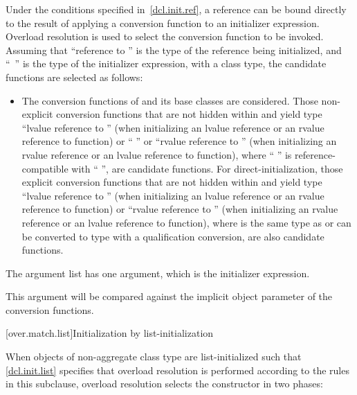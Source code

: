 \pnum
Under the conditions specified in~\ref{dcl.init.ref}, a reference can be bound directly
to the result of applying a conversion
function to an initializer expression.
Overload resolution is used to select the
conversion function to be invoked.
Assuming that ``reference to  '' is the
type of the reference being initialized, and
``\cv{}~'' is the type
of the initializer expression, with
a class type,
the candidate functions are selected as follows:
\begin{itemize}
\item
The conversion functions of
and its base classes are considered.
Those non-explicit conversion functions that are not hidden within
and yield type ``lvalue reference to  ''
(when initializing an lvalue reference or an rvalue reference to function) or
`` ''
or ``rvalue reference to  '' (when initializing an
rvalue reference or an lvalue reference to function),
where `` '' is reference-compatible
with `` '',
are candidate functions. For direct-initialization, those explicit
conversion functions that are not hidden within  and yield
type ``lvalue reference to  ''
(when initializing an lvalue reference or an rvalue reference to function)
or ``rvalue reference to  ''
(when initializing an rvalue reference or an lvalue reference to function),
where  is the same type as  or can be
converted to type  with a qualification
conversion, are also candidate functions.

\end{itemize}

\pnum
The argument list has one argument, which is the initializer expression.
\begin{note}
This argument will be compared against
the implicit object parameter of the conversion functions.
\end{note}

[over.match.list]{Initialization by list-initialization}%

\pnum
When objects of non-aggregate class type  are
list-initialized such that \ref{dcl.init.list} specifies that overload resolution
is performed according to the rules in this subclause, overload resolution selects the
constructor in two phases:

